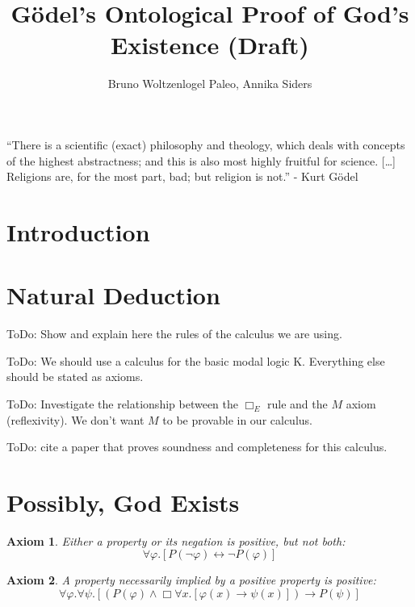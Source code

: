 \documentclass{article}
\author{Bruno Woltzenlogel Paleo, Annika Siders}
\title{G\"{o}del's Ontological Proof of God's Existence (Draft)}
\newtheorem{axiom}{Axiom}
\newcommand{\imp}{\rightarrow}
\newcommand{\biimp}{\leftrightarrow}
\newcommand{\all}{\forall}
\newcommand{\nec}{\Box} %
\begin{document}
\maketitle

\newcommand{\ess}[2]{#1 \ \mathit{ess} \ #2}
\newcommand{\NE}{E}


\noindent
``There is a scientific (exact) philosophy and theology,
which deals with concepts of the highest abstractness; and this is also most highly fruitful for science. [\ldots] Religions are, for the most part, bad; but religion is not.'' - Kurt G\"{o}del

\section{Introduction}

\section{Natural Deduction}

ToDo: Show and explain here the rules of the calculus we are using.

ToDo: We should use a calculus for the basic modal logic K. Everything else should be stated as axioms.

ToDo: Investigate the relationship between the $\nec_E$ rule and the $M$ axiom (reflexivity). We don't want $M$ to be provable in our calculus. 

ToDo: cite a paper that proves soundness and completeness for this calculus.

\section{Possibly, God Exists}

\begin{axiom}
\label{A1}
Either a property or its negation is positive, but not both:
$$
\all \varphi. [P(\neg \varphi) \biimp \neg P(\varphi)]
$$
\end{axiom}

\begin{axiom}
\label{A2}
A property necessarily implied by a positive property is positive:
$$
\all \varphi. \all \psi.[(P(\varphi) \wedge \nec \all x.[\varphi(x) \imp \psi(x)]) \imp P(\psi)]
$$
\end{axiom}
\end{document}
